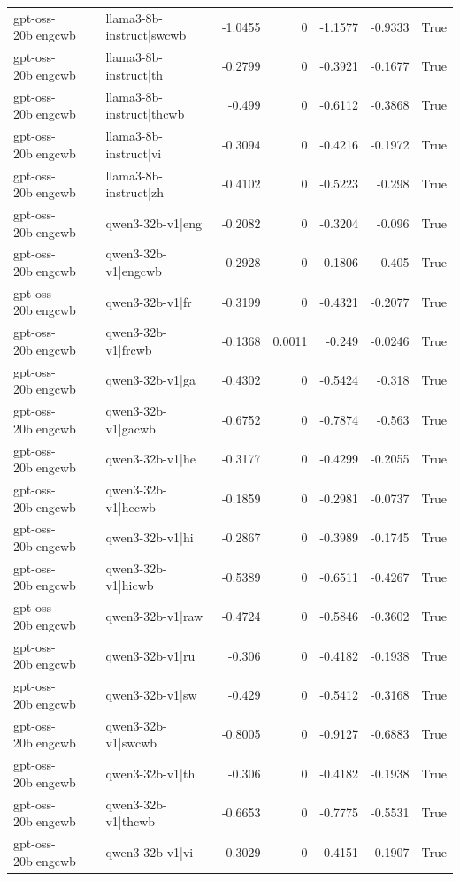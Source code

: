 \begin{table}
\begin{tabular}{l l r r r r l}
gpt-oss-20b|engcwb & llama3-8b-instruct|swcwb & -1.0455 & 0 & -1.1577 & -0.9333 & True \\
gpt-oss-20b|engcwb & llama3-8b-instruct|th & -0.2799 & 0 & -0.3921 & -0.1677 & True \\
gpt-oss-20b|engcwb & llama3-8b-instruct|thcwb & -0.499 & 0 & -0.6112 & -0.3868 & True \\
gpt-oss-20b|engcwb & llama3-8b-instruct|vi & -0.3094 & 0 & -0.4216 & -0.1972 & True \\
gpt-oss-20b|engcwb & llama3-8b-instruct|zh & -0.4102 & 0 & -0.5223 & -0.298 & True \\
gpt-oss-20b|engcwb & qwen3-32b-v1|eng & -0.2082 & 0 & -0.3204 & -0.096 & True \\
gpt-oss-20b|engcwb & qwen3-32b-v1|engcwb & 0.2928 & 0 & 0.1806 & 0.405 & True \\
gpt-oss-20b|engcwb & qwen3-32b-v1|fr & -0.3199 & 0 & -0.4321 & -0.2077 & True \\
gpt-oss-20b|engcwb & qwen3-32b-v1|frcwb & -0.1368 & 0.0011 & -0.249 & -0.0246 & True \\
gpt-oss-20b|engcwb & qwen3-32b-v1|ga & -0.4302 & 0 & -0.5424 & -0.318 & True \\
gpt-oss-20b|engcwb & qwen3-32b-v1|gacwb & -0.6752 & 0 & -0.7874 & -0.563 & True \\
gpt-oss-20b|engcwb & qwen3-32b-v1|he & -0.3177 & 0 & -0.4299 & -0.2055 & True \\
gpt-oss-20b|engcwb & qwen3-32b-v1|hecwb & -0.1859 & 0 & -0.2981 & -0.0737 & True \\
gpt-oss-20b|engcwb & qwen3-32b-v1|hi & -0.2867 & 0 & -0.3989 & -0.1745 & True \\
gpt-oss-20b|engcwb & qwen3-32b-v1|hicwb & -0.5389 & 0 & -0.6511 & -0.4267 & True \\
gpt-oss-20b|engcwb & qwen3-32b-v1|raw & -0.4724 & 0 & -0.5846 & -0.3602 & True \\
gpt-oss-20b|engcwb & qwen3-32b-v1|ru & -0.306 & 0 & -0.4182 & -0.1938 & True \\
gpt-oss-20b|engcwb & qwen3-32b-v1|sw & -0.429 & 0 & -0.5412 & -0.3168 & True \\
gpt-oss-20b|engcwb & qwen3-32b-v1|swcwb & -0.8005 & 0 & -0.9127 & -0.6883 & True \\
gpt-oss-20b|engcwb & qwen3-32b-v1|th & -0.306 & 0 & -0.4182 & -0.1938 & True \\
gpt-oss-20b|engcwb & qwen3-32b-v1|thcwb & -0.6653 & 0 & -0.7775 & -0.5531 & True \\
gpt-oss-20b|engcwb & qwen3-32b-v1|vi & -0.3029 & 0 & -0.4151 & -0.1907 & True \\

\end{tabular}
\end{table}
